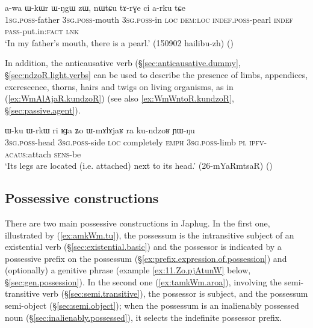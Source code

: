 \begin{exe}
\ex \label{ex:tArGe.ci.arku}
\gll a-wa ɯ-kɯr ɯ-ŋgɯ zɯ, nɯtɕu tɤ-rɣe ci a-rku tɕe \\
\textsc{1sg}.\textsc{poss}-father \textsc{3sg}.\textsc{poss}-mouth \textsc{3sg}.\textsc{poss}-in \textsc{loc} \textsc{dem}:\textsc{loc} \textsc{indef}.\textsc{poss}-pearl \textsc{indef} \textsc{pass}-put.in:\textsc{fact} \textsc{lnk} \\
\glt `In my father's mouth, there is a pearl.' (150902 hailibu-zh)
()
  \end{exe}

In addition, the anticausative  verb  (§\ref{sec:anticausative.dummy}, §\ref{sec:ndzoR.light.verbs} can be used to describe the presence of limbs, appendices, excrescence, thorns, hairs and twigs on living organisms, as in (\ref{ex:WmAlAjaR.kundzoR}) (see also \ref{ex:WmWntoR.kundzoR}, §\ref{sec:passive.agent}).

\begin{exe}
\ex \label{ex:WmAlAjaR.kundzoR}
\gll ɯ-ku ɯ-rkɯ ri ʁɟa ʑo ɯ-mɤlɤjaʁ ra ku-ndzoʁ ɲɯ-ŋu \\
\textsc{3sg}.\textsc{poss}-head \textsc{3sg}.\textsc{poss}-side \textsc{loc} completely \textsc{emph} \textsc{3sg}.\textsc{poss}-limb \textsc{pl} \textsc{ipfv}-\textsc{acaus}:attach \textsc{sens}-be \\
\glt `Its legs are located (i.e. attached) next to its head.' (26-mYaRmtsaR)
()
\end{exe}

\subsection{Possessive constructions} \label{sec:possessive.constructions}
There are two main possessive constructions in Japhug. In the first one, illustrated by (\ref{ex:amkWm.tu}), the possessum is the intransitive subject of an existential verb (§\ref{sec:existential.basic}) and the possessor is indicated by a possessive prefix on the possessum (§\ref{ex:prefix.expression.of.possession}) and (optionally) a genitive phrase (example \ref{ex:11.Zo.pjAtunW} below, §\ref{sec:gen.possession}). In the second one (\ref{ex:tamkWm.aroa}), involving the semi-transitive verb   (§\ref{sec:semi.transitive}), the possessor is subject, and the possessum semi-object (§\ref{sec:semi.object}); when the possessum is an inalienably possessed noun (§\ref{sec:inalienably.possessed}), it selects the indefinite possessor prefix. 

